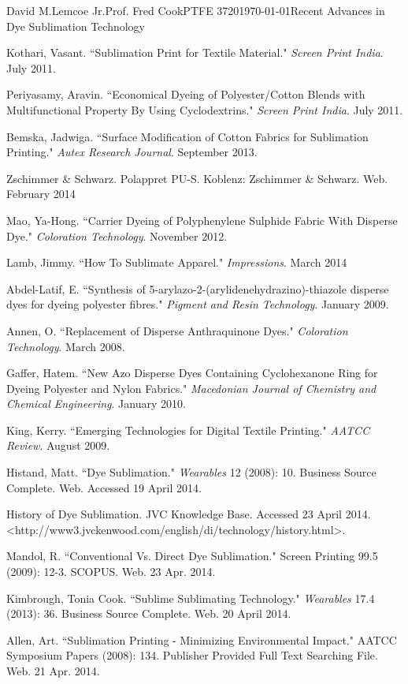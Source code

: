 \documentclass[12pt,letterpaper]{article}
\begin{document}
\begin{mla}{David M.}{Lemcoe Jr.}{Prof. Fred Cook}{PTFE 3720}{\today}{Recent Advances in Dye Sublimation Technology}
\begin{workscited}

\bibent
Kothari, Vasant.  ``Sublimation Print for Textile Material."  \textit{Screen Print India}.  July 2011.

\bibent
Periyasamy, Aravin.  ``Economical Dyeing of Polyester/Cotton Blends with Multifunctional Property By Using Cyclodextrins."  \textit{Screen Print India}.  July 2011.

\bibent
Bemska, Jadwiga. ``Surface Modification of Cotton Fabrics for Sublimation Printing." \textit{Autex Research Journal}. September 2013.

\bibent
Zschimmer \& Schwarz. Polappret PU-S. Koblenz: Zschimmer \& Schwarz. Web. February 2014

\bibent
Mao, Ya-Hong. ``Carrier Dyeing of Polyphenylene Sulphide Fabric With Disperse Dye." \textit{Coloration Technology}. November 2012.

\bibent
Lamb, Jimmy. ``How To Sublimate Apparel." \textit{Impressions}. March 2014

\bibent
Abdel-Latif, E. ``Synthesis of 5-arylazo-2-(arylidenehydrazino)-thiazole disperse dyes for dyeing polyester fibres." \textit{Pigment and Resin Technology}. January 2009.

\bibent
Annen, O. ``Replacement of Disperse Anthraquinone Dyes." \textit{Coloration Technology}. March 2008.

\bibent
Gaffer, Hatem. ``New Azo Disperse Dyes Containing Cyclohexanone Ring for Dyeing Polyester and Nylon Fabrics." \textit{Macedonian Journal of Chemistry and Chemical Engineering}. January 2010.

\bibent
King, Kerry. ``Emerging Technologies for Digital Textile Printing." \textit{AATCC Review}. August 2009.

\bibent
Histand, Matt. ``Dye Sublimation." \textit{Wearables} 12 (2008): 10. Business Source Complete. Web. Accessed 19 April 2014.

\bibent
History of Dye Sublimation. JVC Knowledge Base. Accessed 23 April 2014. <http://www3.jvckenwood.com/english/di/technology/history.html>.

\bibent
Mandol, R. ``Conventional Vs. Direct Dye Sublimation." Screen Printing 99.5 (2009): 12-3. SCOPUS. Web. 23 Apr. 2014.

\bibent
Kimbrough, Tonia Cook. ``Sublime Sublimating Technology." \textit{Wearables} 17.4 (2013): 36. Business Source Complete. Web. 20 April 2014.

\bibent
Allen, Art. ``Sublimation Printing - Minimizing Environmental Impact." AATCC Symposium Papers (2008): 134. Publisher Provided Full Text Searching File. Web. 21 Apr. 2014.


\end{workscited}
\end{mla}
\end{document}
